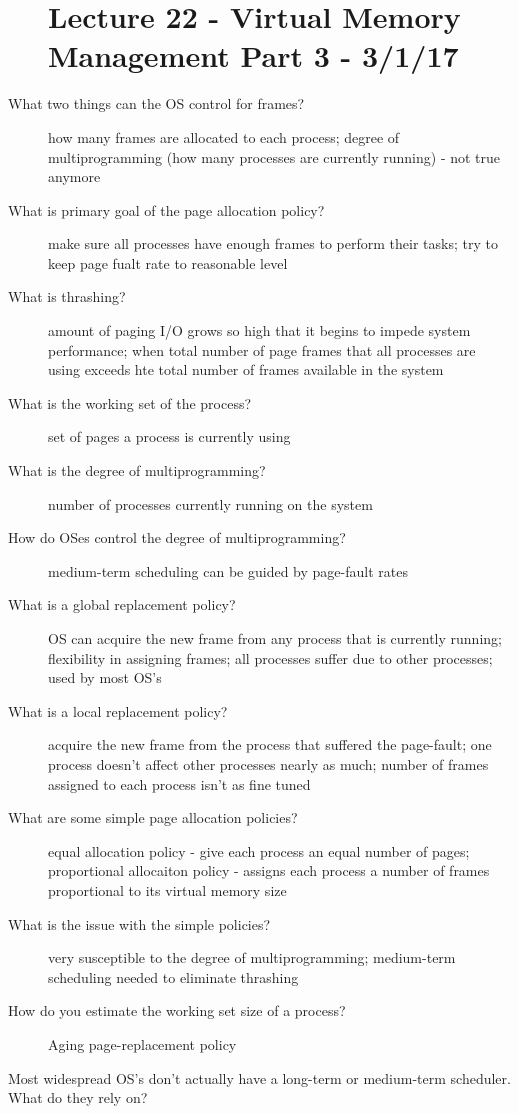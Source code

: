 \documentclass[10pt]{article}
\begin{document}
\begin{description}
\section{Lecture 22 - Virtual Memory Management Part 3 - 3/1/17}
\item[What two things can the OS control for frames?]
  how many frames are allocated to each process; degree of multiprogramming (how many processes are currently running) - not true anymore
\item[What is primary goal of the page allocation policy?]
  make sure all processes have enough frames to perform their tasks;
  try to keep page fualt rate to reasonable level
\item[What is thrashing?]
  amount of paging I/O grows so high that it begins to impede system performance;
  when total number of page frames that all processes are using exceeds hte total number of frames available in the system
\item[What is the working set of the process?]
  set of pages a process is currently using
\item[What is the degree of multiprogramming?]
  number of processes currently running on the system
\item[How do OSes control the degree of multiprogramming?]
  medium-term scheduling can be guided by page-fault rates
\item[What is a global replacement policy?]
  OS can acquire the new frame from any process that is currently running;
  flexibility in assigning frames; all processes suffer due to other processes;
  used by most OS's
\item[What is a local replacement policy?]
  acquire the new frame from the process that suffered the page-fault;
  one process doesn't affect other processes nearly as much; number of frames assigned to each process isn't as fine tuned
\item[What are some simple page allocation policies?]
  equal allocation policy - give each process an equal number of pages;
  proportional allocaiton policy - assigns each process a number of frames proportional to its virtual memory size
\item[What is the issue with the simple policies?]
  very susceptible to the degree of multiprogramming;
  medium-term scheduling needed to eliminate thrashing
\item[How do you estimate the working set size of a process?]
  Aging page-replacement policy
\item[Most widespread OS's don't actually have a long-term or medium-term scheduler. What do they rely on?]

\end{description}
\end{document}
